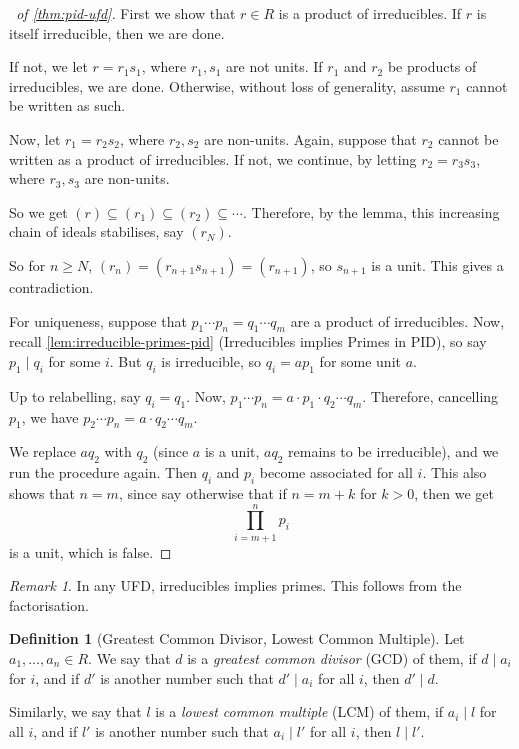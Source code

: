\documentclass{article}
\theoremstyle{definition}
\newtheorem{definition}[theorem]{Definition}
\theoremstyle{remark}
\newtheorem{remark}[theorem]{Remark}
\newcommand{\pqty}[1]{\left(#1\right)}
\newcommand{\divides}{\mid}
\begin{document}
\begin{proof}[\proofname\ of \autoref{thm:pid-ufd}]
    First we show that \(r \in R\) is a product of irreducibles. If \(r\) is itself irreducible, then we are done.

    If not, we let \(r = r_1 s_1\), where \(r_1, s_1\) are not units. If \(r_1\) and \(r_2\) be products of irreducibles, we are done. Otherwise, without loss of generality, assume \(r_1\) cannot be written as such.

    Now, let \(r_1 = r_2 s_2\), where \(r_2, s_2\) are non-units. Again, suppose that \(r_2\) cannot be written as a product of irreducibles. If not, we continue, by letting \(r_2 = r_3 s_3\), where \(r_3, s_3\) are non-units.

    So we get \(\pqty{r} \subseteq \pqty{r_1} \subseteq \pqty{r_2} \subseteq \cdots\). Therefore, by the lemma, this increasing chain of ideals stabilises, say \(\pqty{r_N}\).

    So for \(n \geq N\), \(\pqty{r_n} = \pqty{r_{n + 1} s_{n + 1}} = \pqty{r_{n + 1}}\), so \(s_{n + 1}\) is a unit. This gives a contradiction.

    For uniqueness, suppose that \(p_1 \cdots p_n = q_1 \cdots q_m\) are a product of irreducibles. Now, recall \autoref{lem:irreducible-primes-pid} (Irreducibles implies Primes in PID), so say \(p_1 \divides q_i\) for some \(i\). But \(q_i\) is irreducible, so \(q_i = a p_1\) for some unit \(a\).

    Up to relabelling, say \(q_i = q_1\). Now, \(p_1 \cdots p_n = a \cdot p_1 \cdot q_2 \cdots q_m\). Therefore, cancelling \(p_1\), we have \(p_2 \cdots p_n = a \cdot q_2 \cdots q_m\).

    We replace \(a q_2\) with \(q_2\) (since \(a\) is a unit, \(a q_2\) remains to be irreducible), and we run the procedure again. Then \(q_i\) and \(p_i\) become associated for all \(i\). This also shows that \(n = m\), since say otherwise that if \(n = m + k\) for \(k > 0\), then we get
    \[
        \prod_{i = m + 1}^{n} p_i
    \]
    is a unit, which is false.
\end{proof}

\begin{remark}
    In any UFD, irreducibles implies primes. This follows from the factorisation.
\end{remark}

\begin{definition}[Greatest Common Divisor, Lowest Common Multiple]
    \label{def:gcd-lcm}%
    Let \(a_1, \ldots, a_n \in R\). We say that \(d\) is a \emph{greatest common divisor} (GCD) of them, if \(d \divides a_i\) for \(i\), and if \(d'\) is another number such that \(d' \divides a_i\) for all \(i\), then \(d' \divides d\).

    Similarly, we say that \(l\) is a \emph{lowest common multiple} (LCM) of them, if \(a_i \divides l\) for all \(i\), and if \(l'\) is another number such that \(a_i \divides l'\) for all \(i\), then \(l \divides l'\).
\end{definition}
\end{document}
